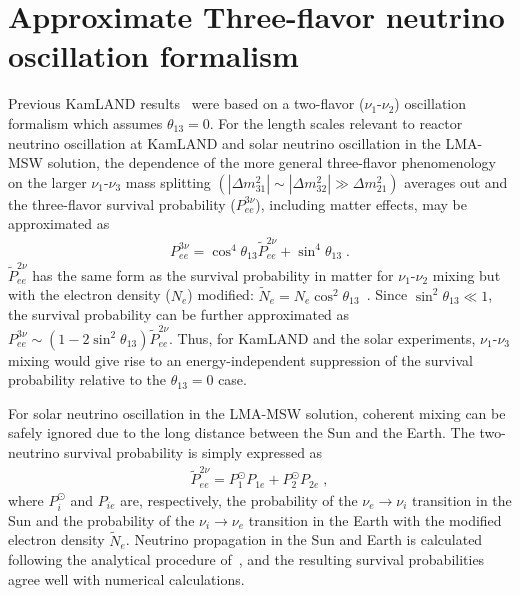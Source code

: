 \documentclass[aps,prc,twocolumn,groupedaddress,showpacs,amsmath,amssymb,floatfix,superscriptaddress]{revtex4}
\begin{document}
\section{Approximate Three-flavor neutrino oscillation formalism }
\label{section:Earth}
Previous KamLAND results~\cite{Abe2008} were based on a two-flavor ($\nu_{1}$-$\nu_{2}$) oscillation formalism which assumes \mbox{$\theta_{13}=0$}.  For the length scales relevant to reactor neutrino oscillation at KamLAND and solar neutrino oscillation in the LMA-MSW solution,  the dependence of the more general three-flavor phenomenology on the larger $\nu_{1}$-$\nu_{3}$ mass splitting \mbox{$(|\Delta m^2_{31}| \sim |\Delta m^2_{32}|\gg \Delta m^2_{21})$} averages out and the three-flavor survival probability ($P^{3\nu}_{ee}$), including matter effects, may be approximated as 
\begin{eqnarray}
P_{ee}^{3\nu} = \cos^{4}\theta_{13} \widetilde{P}_{ee}^{2\nu} + \sin^{4}\theta_{13} \;.
\end{eqnarray}
$\widetilde{P}_{ee}^{2\nu}$ has the same form as the survival probability in matter for \mbox{$\nu_{1}$-$\nu_{2}$} mixing but with the electron density \mbox{($N_{e}$)} modified: \mbox{$\widetilde{N}_{e} = N_{e}\cos^{2}\theta_{13}$}~\cite{Goswami2005}. Since \mbox{$\sin^{2}\theta_{13} \ll 1$}, the survival probability can be further approximated as \mbox{$P_{ee}^{3\nu} \sim (1 - 2 \sin^{2}\theta_{13}) \widetilde{P}_{ee}^{2\nu}$}.  Thus, for KamLAND and the solar experiments, $\nu_{1}$-$\nu_{3}$ mixing would give rise to an energy-independent suppression of the survival probability relative to the $\theta_{13}=0$ case.

For solar neutrino oscillation in the LMA-MSW solution, coherent mixing can be safely ignored due to the long distance between the Sun and the Earth. The two-neutrino survival probability is simply expressed as
\begin{eqnarray}
\widetilde{P}_{ee}^{2\nu} = P^{\odot}_{1} P_{1e} + P^{\odot}_{2} P_{2e} \;,
\end{eqnarray}
where $P^{\odot}_{i}$ and $P_{ie}$ are, respectively, the probability of the \mbox{$\nu_{e} \rightarrow \nu_{i}$} transition in the Sun and the probability of the \mbox{$\nu_{i} \rightarrow \nu_{e}$} transition in the Earth with the modified electron density \mbox{$\widetilde{N}_{e}$}.  Neutrino propagation in the Sun and Earth is calculated following the analytical procedure of~\cite{Parke1986, Lisi1997}, and the resulting survival probabilities agree well with numerical calculations.
\end{document}
